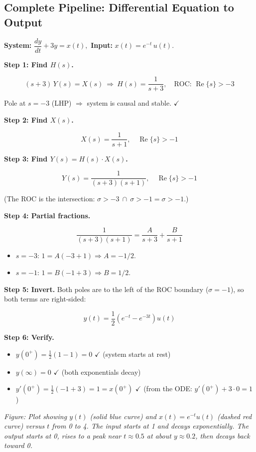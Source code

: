 \documentclass[11pt]{article}
\begin{document}
\subsection*{Complete Pipeline: Differential Equation to Output}

\textbf{System:} $\dfrac{dy}{dt} + 3y = x(t),$ \textbf{Input:} $x(t) = e^{-t}\, u(t)$.

\textbf{Step 1: Find $H(s)$.}

\[(s + 3)\, Y(s) = X(s) \ \Rightarrow\ H(s) = \frac{1}{s+3}, \quad \text{ROC: } \operatorname{Re}\{s\} > -3\]

Pole at $s = -3$ (LHP) $\Rightarrow$ system is causal and stable. $\checkmark$

\textbf{Step 2: Find $X(s)$.}

\[X(s) = \frac{1}{s+1}, \quad \operatorname{Re}\{s\} > -1\]

\textbf{Step 3: Find $Y(s) = H(s) \cdot X(s)$.}

\[Y(s) = \frac{1}{(s+3)(s+1)}, \quad \operatorname{Re}\{s\} > -1\]

(The ROC is the intersection: $\sigma > -3\ \cap\ \sigma > -1 = \sigma > -1$.)

\textbf{Step 4: Partial fractions.}

\[\frac{1}{(s+3)(s+1)} = \frac{A}{s+3} + \frac{B}{s+1}\]

\begin{itemize}
  \item $s = -3$: $1 = A(-3+1) \Rightarrow A = -1/2$.
  \item $s = -1$: $1 = B(-1+3) \Rightarrow B = 1/2$.
\end{itemize}

\textbf{Step 5: Invert.} Both poles are to the left of the ROC boundary ($\sigma = -1$), so both terms are right-sided:

\[y(t) = \frac{1}{2}\left(e^{-t} - e^{-3t}\right) u(t)\]

\textbf{Step 6: Verify.}

\begin{itemize}
  \item $y(0^+) = \tfrac{1}{2}(1-1) = 0$ $\checkmark$ (system starts at rest)
  \item $y(\infty) = 0$ $\checkmark$ (both exponentials decay)
  \item $y'(0^+) = \tfrac{1}{2}(-1+3) = 1 = x(0^+)$ $\checkmark$ (from the ODE: $y'(0^+) + 3 \cdot 0 = 1$)
\end{itemize}

\textit{Figure: Plot showing $y(t)$ (solid blue curve) and $x(t) = e^{-t}u(t)$ (dashed red curve) versus $t$ from 0 to 4. The input starts at 1 and decays exponentially. The output starts at 0, rises to a peak near $t \approx 0.5$ at about $y \approx 0.2$, then decays back toward 0.}
\end{document}
